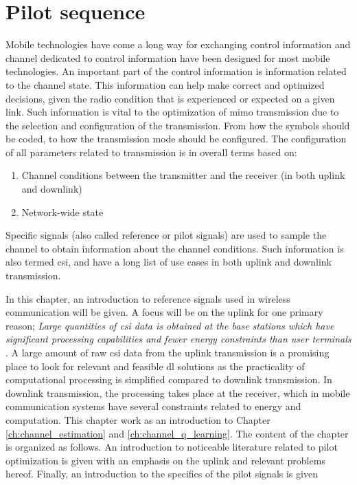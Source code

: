 \chapter{Pilot sequence}\label{ch:pilot_sequence}

Mobile technologies have come a long way for exchanging control information and channel dedicated to control information have been designed for most mobile technologies. An important part of the control information is information related to the channel state. This information can help make correct and optimized decisions, given the radio condition that is experienced or expected on a given link. Such information is vital to the optimization of \gls{mimo} transmission due to the selection and configuration of the transmission. From how the symbols should be coded, to how the transmission mode should be configured. The configuration of all parameters related to transmission is in overall terms based on:

\begin{enumerate}
    \item Channel conditions between the transmitter and the receiver (in both uplink and downlink)
    \item Network-wide state
\end{enumerate}

Specific signals (also called reference or pilot signals) are used to sample the channel to obtain information about the channel conditions. Such information is also termed \gls{csi}, and have a long list of use cases in both uplink and downlink transmission.

In this chapter, an introduction to reference signals used in wireless communication will be given. A focus will be on the uplink for one primary reason; \emph{Large quantities of \gls{csi} data is obtained at the base stations which have significant processing capabilities and fewer energy constraints than user terminals \cite{Studer2018}}. A large amount of raw \gls{csi} data from the uplink transmission is a promising place to look for relevant and feasible \gls{dl} solutions as the practicality of computational processing is simplified compared to downlink transmission. In downlink transmission, the processing takes place at the receiver, which in mobile communication systems have several constraints related to energy and computation. This chapter work as an introduction to Chapter \ref{ch:channel_estimation} and \ref{ch:channel_q_learning}. The content of the chapter is organized as follows. An introduction to noticeable literature related to pilot optimization is given with an emphasis on the uplink and relevant problems hereof. Finally, an introduction to the specifics of the pilot signals is given


